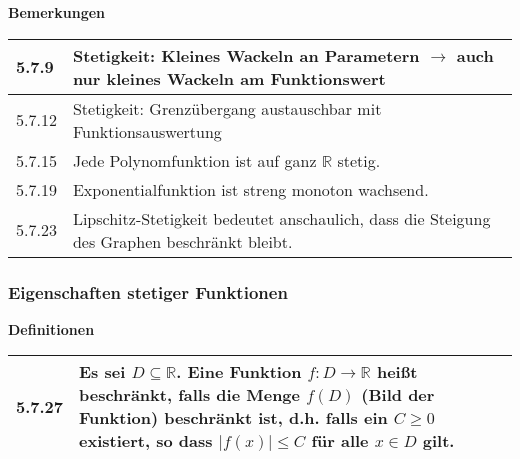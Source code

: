     \noindent
    \textbf{Bemerkungen}
    \begin{table}[H]
    \begin{tabularx}{\textwidth}{X m{16cm}}
        \toprule

        5.7.9 & Stetigkeit: Kleines Wackeln an Parametern $\rightarrow$ auch nur kleines Wackeln am Funktionswert \\
        \midrule
        5.7.12& Stetigkeit: Grenzübergang austauschbar mit Funktionsauswertung \\
        \midrule
        5.7.15& Jede Polynomfunktion ist auf ganz $\mathbb{R}$ stetig. \\
        \midrule
        5.7.19& Exponentialfunktion ist streng monoton wachsend. \\
        \midrule
        5.7.23& Lipschitz-Stetigkeit bedeutet anschaulich, dass die Steigung des Graphen beschränkt bleibt. \\

        \bottomrule
    \end{tabularx}
    \end{table}

\subsubsection{Eigenschaften stetiger Funktionen}

        \noindent
    \textbf{Definitionen}
    \begin{table}[H]  
    \begin{tabularx}{\textwidth}{X m{16cm}}
        \toprule

        5.7.27& Es sei $D \subseteq \mathbb{R}$. Eine Funktion $f: D \rightarrow \mathbb{R}$ hei\ss t beschränkt, falls die Menge
                $f(D)$ (Bild der Funktion) beschränkt ist, d.h. falls ein $C \geq 0$ existiert, so dass $|f(x)| \leq C$ für alle $x \in D$ gilt. \\

        \bottomrule

    \end{tabularx}
    \end{table}

